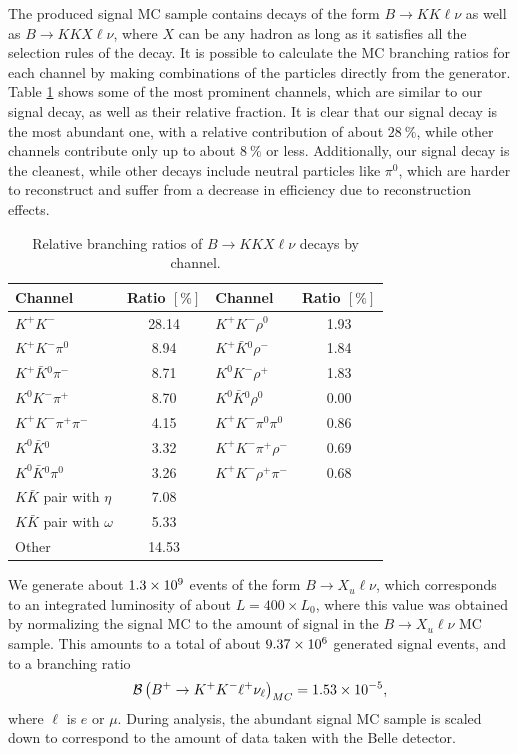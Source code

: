 The produced signal MC sample contains decays of the form $B \to KK\ell \nu$ as well as $B \to KKX\ell \nu$, where $X$ can be any hadron as long as it satisfies all the selection rules of the decay. It is possible to calculate the MC branching ratios for each channel by making combinations of the particles directly from the generator. Table \ref{tab:KKX} shows some of the most prominent channels, which are similar to our signal decay, as well as their relative fraction. It is clear that our signal decay is the most abundant one, with a relative contribution of about $28~\%$, while other channels contribute only up to about $8~\%$ or less. Additionally, our signal decay is the cleanest, while other decays include neutral particles like $\pi^0$, which are harder to reconstruct and suffer from a decrease in efficiency due to reconstruction effects.
\begin{table}[H]
	\centering
	\begin{tabular}{l|c||l|c}
		Channel & Ratio $[\%]$ & Channel & Ratio $[\%]$ \\
		\toprule 
		$K^+ K^-$ & 28.14 & $K^+ K^- \rho^0$ & 1.93 \\
		$K^+ K^- \pi^0$ & 8.94 & $K^+ \bar{K}{}^0 \rho^-$ & 1.84 \\
		$K^+ \bar{K}{}^0 \pi^-$ & 8.71 & $K^0 K^- \rho^+$ & 1.83 \\
		$K^0 K^- \pi^+$ & 8.70 & $K^0 \bar K {}^0 \rho^0$ & 0.00 \\
		$K^+ K^- \pi^+ \pi^-$ & 4.15 &  $K^+ K^- \pi^0 \pi^0$ & 0.86 \\
		$K^0 \bar K {}^0$ & 3.32  & $K^+ K^- \pi^+ \rho^-$ & 0.69 \\
		$K^0 \bar K {}^0 \pi^0$ & 3.26 & $K^+ K^- \rho^+ \pi^-$ & 0.68 \\
		\midrule
		$K \bar K$ pair with $\eta$ & 7.08  & & \\
		$K \bar K$ pair with $\omega$ & 5.33  & & \\
		Other & 14.53  & & \\
		\bottomrule 
	\end{tabular}
	\captionsetup{width=.8\linewidth}
	\caption{Relative branching ratios of $B \to KKX\ell \nu$ decays by channel.}
	\label{tab:KKX}
\end{table}

We generate about $1.3\times 10^{9}$ events of the form $B\to X_u \ell \nu$, which corresponds to an integrated luminosity of about $L = 400\times L_0$, where this value was obtained by normalizing the signal MC to the amount of signal in the $B\to X_u \ell \nu$ MC sample. This amounts to a total of about $9.37\times 10^{6}$ generated signal events, and to a branching ratio
\begin{equation}
\mathcal{B}\left(B^+ \to K^+ K^- \ell^+ \nu_\ell\right)_{MC} = 1.53\times 10^{-5},
\end{equation}
where $\ell$ is $e$ or $\mu$. During analysis, the abundant signal MC sample is scaled down to correspond to the amount of data taken with the Belle detector.

